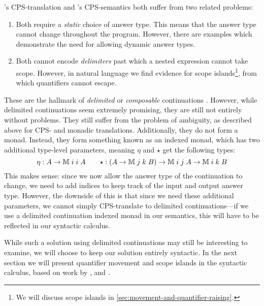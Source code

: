 \vspace*{1\baselineskip}

\citeauthor{barker2004}'s CPS-translation and
\citeauthor{moortgat2012}'s CPS-semantics both suffer from two related
problems:
\begin{enumerate}
\item Both require a \emph{static} choice of answer type. This
  means that the answer type cannot change throughout the
  program. However, there are examples which demonstrate the need for
  allowing dynamic answer types.
\item Both cannot encode \emph{delimiters} past which a nested
  expression cannot take scope. However, in natural language we find
  evidence for scope islands\footnote{%
    We will discuss scope islands in
    \autoref{sec:movement-and-quantifier-raising}.
  }, from which quantifiers cannot escape.
\end{enumerate}
These are the hallmark of \emph{delimited} or \emph{composable}
continuations \citep{danvy1990}. However, while delimited
continuations seem extremely promising, they are still not entirely
without problems. They still suffer from the problem of ambiguity, as
described above for CPS- and monadic translations. Additionally, they
do not form a monad. Instead, they form something known as an indexed
monad, which has two additional type-level parameters, meaning $\eta$
and $\star$ get the following types:
\[
  \eta : A\rightarrow\mathbb{M}\;i\;i\;A
  \qquad
  \star: (A\rightarrow\mathbb{M}\;j\;k\;B)\rightarrow\mathbb{M}\;i\;j\;A\rightarrow\mathbb{M}\;i\;k\;B
\]
This makes sense: since we now allow the answer type of the
continuation to change, we need to add indices to keep track of the
input and output answer type. However, the downside of this is that
since we need these additional parameters, we cannot simply
CPS-translate to delimited continuations---if we use a delimited
continuation indexed monad in our semantics, this will have to be
reflected in our syntactic calculus.

While such a solution using delimited continuations may still be
interesting to examine, we will choose to keep our solution entirely
syntactic. In the next section we will present quantifier movement and
scope islands in the syntactic calculus, based on work by
\citet{moortgat1996}, \citet{barker2007} and \citet{barker2015}.

